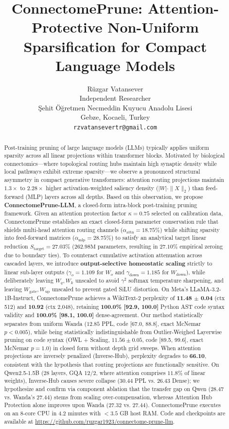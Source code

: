 \documentclass{article}
\title{ConnectomePrune: Attention-Protective Non-Uniform Sparsification for Compact Language Models}
\author{%
  Rüzgar Vatansever \\
  Independent Researcher \\
  Şehit Öğretmen Necmeddin Kuyucu Anadolu Lisesi \\
  Gebze, Kocaeli, Turkey \\
  \texttt{rzvatansevertr@gmail.com} \\
}
\begin{document}
\maketitle

\begin{abstract}
Post-training pruning of large language models (LLMs) typically applies uniform sparsity across all linear projections within transformer blocks. Motivated by biological connectomics—where topological routing hubs maintain high synaptic density while local pathways exhibit extreme sparsity—we observe a pronounced structural asymmetry in compact generative transformers: attention routing projections maintain $1.3\times$ to $2.28\times$ higher activation-weighted saliency density ($|W| \cdot \|X\|_2$) than feed-forward (MLP) layers across all depths. Based on this observation, we propose \textbf{ConnectomePrune-LLM}, a closed-form intra-block post-training pruning framework. Given an attention protection factor $\kappa = 0.75$ selected on calibration data, ConnectomePrune establishes an exact closed-form parameter conservation rule that shields multi-head attention routing channels ($\alpha_{\text{attn}} = 18.75\%$) while shifting sparsity into feed-forward matrices ($\alpha_{\text{mlp}} = 28.75\%$) to satisfy an analytical target linear reduction $S_{\text{target}} = 27.03\%$ ($262.98\text{M}$ parameters, resulting in $27.10\%$ empirical zeroing due to boundary ties). To counteract cumulative activation attenuation across cascaded layers, we introduce \textbf{output-selective homeostatic scaling} strictly to linear sub-layer outputs ($\gamma_o = 1.109$ for $W_o$ and $\gamma_{\text{down}} = 1.185$ for $W_{\text{down}}$), while deliberately leaving $W_q, W_k$ unscaled to avoid $\gamma^2$ softmax temperature sharpening, and leaving $W_{\text{gate}}, W_{\text{up}}$ unscaled to prevent gated SiLU distortion. On Meta's LLaMA-3.2-1B-Instruct, ConnectomePrune achieves a WikiText-2 perplexity of \textbf{11.48 $\pm$ 0.04} (ctx 512) and \textbf{10.92} (ctx 2,048), retaining \textbf{100.0\% [92.9, 100.0]} Python AST code syntax validity and \textbf{100.0\% [98.1, 100.0]} dense-agreement. Our method statistically separates from uniform Wanda ($12.85$ PPL, code [67.0, 88.8], exact McNemar $p < 0.005$), while being statistically indistinguishable from Outlier-Weighed Layerwise pruning on code syntax (OWL + Scaling, $11.56 \pm 0.05$, code [89.5, 99.6], exact McNemar $p = 1.0$) in closed form without depth grid sweeps. When attention projections are inversely penalized (Inverse-Hub), perplexity degrades to \textbf{66.10}, consistent with the hypothesis that routing projections are functionally sensitive. On Qwen2.5-1.5B (28 layers, GQA 12/2, where attention comprises $11.8\%$ of linear weights), Inverse-Hub causes severe collapse ($30.44$ PPL vs. $26.43$ Dense); we hypothesize and confirm via component ablation that the transfer gap on Qwen ($28.47$ vs. Wanda's $27.44$) stems from scaling over-compensation, whereas Attention Hub Protection alone improves upon Wanda ($27.32$ vs. $27.44$). ConnectomePrune executes on an 8-core CPU in $4.2$ minutes with $< 3.5$ GB host RAM. Code and checkpoints are available at \url{https://github.com/ruzgar1923/connectome-prune-llm}.
\end{abstract}
\end{document}
